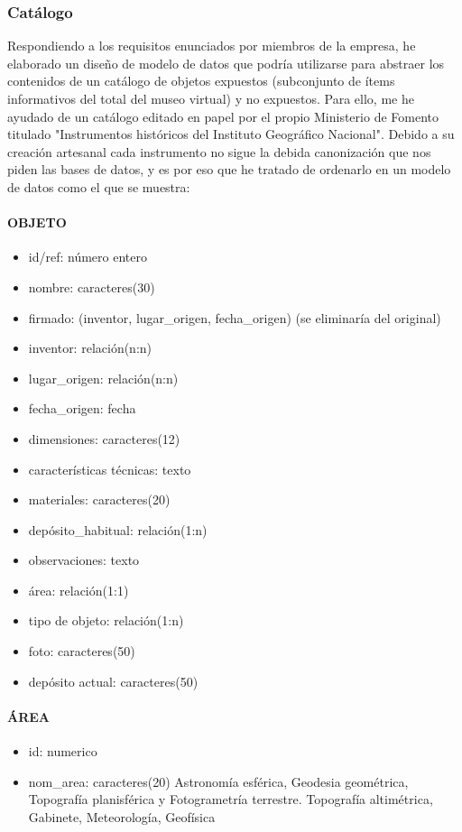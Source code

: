 \subsubsection{Catálogo}
\par Respondiendo a los requisitos enunciados por miembros de la empresa, he elaborado un diseño de modelo de datos que podría utilizarse para abstraer los contenidos de un catálogo de objetos expuestos (subconjunto de ítems informativos del total del museo virtual) y no expuestos.
Para ello, me he ayudado de un catálogo editado en papel por el propio Ministerio de Fomento titulado "Instrumentos históricos del Instituto Geográfico Nacional". Debido a su creación artesanal cada instrumento no sigue la debida canonización que nos piden las bases de datos, y es por eso que he tratado de ordenarlo en un modelo de datos como el que se muestra:

\paragraph{OBJETO}
\begin{itemize}
\item id/ref: número entero
\item nombre: caracteres(30)
\item firmado: (inventor, lugar\_origen, fecha\_origen) (se eliminaría del original)
\item inventor: relación(n:n)
\item lugar\_origen: relación(n:n)
\item fecha\_origen: fecha
\item dimensiones: caracteres(12)
\item características técnicas: texto
\item materiales: caracteres(20)
\item depósito\_habitual: relación(1:n)
\item observaciones: texto
\item área: relación(1:1)
\item tipo de objeto: relación(1:n)
\item foto: caracteres(50)
\item depósito actual: caracteres(50)
\end{itemize}

\paragraph{ÁREA}
\begin{itemize}
\item id: numerico
\item nom\_area: caracteres(20)
{Astronomía esférica, Geodesia geométrica, Topografía planisférica y Fotogrametría terrestre.
Topografía altimétrica, Gabinete, Meteorología, Geofísica}
\end{itemize}


